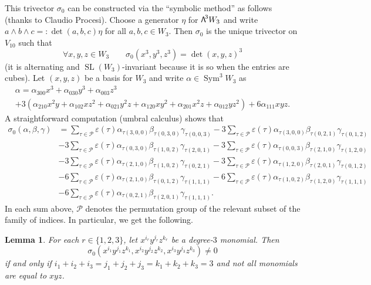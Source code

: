 \documentclass[11pt]{article}
\let\mathcal\mathscr
\newtheorem{lemm}{Lemma}[section]
\theoremstyle{definition}
\newcommand\cP{\mathcal{P}}
\let\eps\varepsilon
\DeclareMathOperator{\Sym}{Sym}
\DeclareMathOperator{\SL}{SL}
\newcommand\bw[1]{{\hbox{\large$\mathsf{\Lambda}$}^{\!#1}}}
\begin{document}
This trivector $\sigma_0$ can be constructed via the ``symbolic method'' as follows (thanks to Claudio Procesi). Choose a generator $\eta$ for $\bw3W_3$ and write $a\wedge b\wedge c=:\det(a,b,c)\eta$ for all $a,b,c\in W_3$. Then $\sigma_0$ is the unique trivector on $V_{10} $ such that
\[
\forall x,y,z\in W_3\qquad \sigma_0(x^3,y^3,z^3)= \det(x,y,z)^3
\]
(it is alternating and $\SL(W_3)$-invariant because it is so when the entries are cubes). Let $(x,y,z)$ be a basis for $W_3$ and
write $\alpha\in \Sym^3\! W_{3}$ as\vspace*{-5pt}
\begin{multline}\label{coordsim}
\alpha=\alpha_{300}x^3+\alpha_{030}y^3+\alpha_{003}z^3 \\
+3(\alpha_{210}x^2 y+\alpha_{102}x z^2+\alpha_{021}y^2 z+\alpha_{120} x y^2+\alpha_{201}x^2 z
+\alpha_{012}y z^2)+6\alpha_{111}xyz.
\end{multline}
A straightforward computation (umbral calculus) shows that
\begin{align}\label{gransomma}\nonumber
\sigma_0(\alpha,\beta,\gamma)&=\sum\limits_{\tau\in\cP}\eps(\tau)\alpha_{\tau(3,0,0)} \beta_{\tau(0,3,0)} \gamma_{\tau(0,0,3)}
- 3\sum\limits_{\tau\in\cP}\eps(\tau)\alpha_{\tau(3,0,0)} \beta_{\tau(0,2,1)} \gamma_{\tau(0,1,2)} \\\nonumber
&- 3\sum\limits_{\tau\in\cP}\eps(\tau)\alpha_{\tau(0,3,0)} \beta_{\tau(1,0,2)} \gamma_{\tau(2,0,1)}
- 3\sum\limits_{\tau\in\cP}\eps(\tau)\alpha_{\tau(0,0,3)} \beta_{\tau(2,1,0)} \gamma_{\tau(1,2,0)} \\
&-3\sum\limits_{\tau\in\cP}\eps(\tau)\alpha_{\tau(2,1,0)} \beta_{\tau(1,0,2)} \gamma_{\tau(0,2,1)}
-3\sum\limits_{\tau\in\cP}\eps(\tau)\alpha_{\tau(1,2,0)} \beta_{\tau(2,0,1)} \gamma_{\tau(0,1,2)} \\\nonumber
&- 6\sum\limits_{\tau\in\cP}\eps(\tau)\alpha_{\tau(2,1,0)} \beta_{\tau(0,1,2)} \gamma_{\tau(1,1,1)}
- 6\sum\limits_{\tau\in\cP}\eps(\tau)\alpha_{\tau(1,0,2)} \beta_{\tau(1,2,0)} \gamma_{\tau(1,1,1)} \\\nonumber
&- 6\sum\limits_{\tau\in\cP}\eps(\tau)\alpha_{\tau(0,2,1)} \beta_{\tau(2,0,1)} \gamma_{\tau(1,1,1)}.
\end{align}
In each sum above, $\cP$ denotes the permutation group of the relevant subset of the family of indices.
In particular, we get the following.

\begin{lemm}\label{nonzero}
For each $r\in\{1,2,3\}$, let $x^{i_r}y^{j_r}z^{k_r}$ be a degree-$3$ monomial. Then
\[
\sigma_0(x^{i_1}y^{j_1}z^{k_1},x^{i_2}y^{j_2}z^{k_2},x^{i_3}y^{j_3}z^{k_3})\ne0
\]
if and only if $i_1+i_2+i_3=j_1+j_2+j_3=k_1+k_2+k_3=3$ and not all monomials are equal to $xyz$.
\end{lemm}
\end{document}

